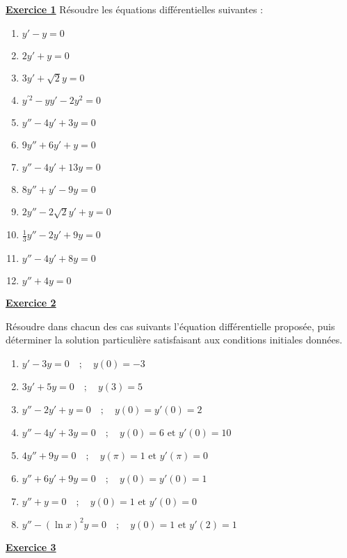 \documentclass[12pt,a4paper]{article}
\newcommand{\exo}[1]{%
        \textbf{\underline{Exercice #1}}
}
\begin{document}
\begin{multicols}{2}
\setlength{\columnseprule}{0.1mm} %
\exo{1} Résoudre les équations différentielles suivantes :
\begin{enumerate}[align=left]
    \item \( \displaystyle  y' - y = 0 \)
    \item \( \displaystyle 2y' + y = 0 \)
    \item \( \displaystyle 3y' + \sqrt{2}y = 0 \)
    \item \( \displaystyle y^{\prime 2} - yy' - 2y^2 = 0 \)
    \item \( \displaystyle  y'' - 4y' + 3y = 0 \)
    \item \( \displaystyle  9y'' + 6y' + y = 0 \)
    \item \( \displaystyle  y'' - 4y' + 13y = 0 \)
    \item \( \displaystyle 8y'' + y' - 9y = 0 \)
    \item \( \displaystyle 2y'' - 2\sqrt{2}y' + y = 0 \)
    \item \( \displaystyle \tfrac{1}{3}y'' - 2y' + 9y = 0 \)
    \item \( \displaystyle y'' - 4y' + 8y = 0 \)
    \item \( \displaystyle y'' + 4y = 0 \)
\end{enumerate}
\exo{2}
Résoudre dans chacun des cas suivants l’équation différentielle proposée, puis déterminer la solution particulière satisfaisant aux conditions initiales données.

\begin{enumerate}
    \item \( \displaystyle y' - 3y = 0 \quad ; \quad y(0) = -3 \)
    \item \( \displaystyle 3y' + 5y = 0 \quad ; \quad y(3) = 5 \)
    \item \( \displaystyle y'' - 2y' + y = 0 \quad ; \quad y(0) = y'(0) = 2 \)
    \item \( \displaystyle y'' - 4y' + 3y = 0 \quad ; \quad y(0) = 6 \text{ et } y'(0) = 10 \)
    \item \( \displaystyle 4y'' + 9y = 0 \quad ; \quad y(\pi) = 1 \text{ et } y'(\pi) = 0 \)
    \item \( \displaystyle y'' + 6y' + 9y = 0 \quad ; \quad y(0) = y'(0) = 1 \)
    \item \( \displaystyle y'' + y = 0 \quad ; \quad y(0) = 1 \text{ et } y'(0) = 0 \)
    \item \( \displaystyle y'' - (\ln x)^2 y = 0 \quad ; \quad y(0) = 1 \text{ et } y'(2) = 1 \)
\end{enumerate}

\exo{3}

\end{multicols}
\end{document}
